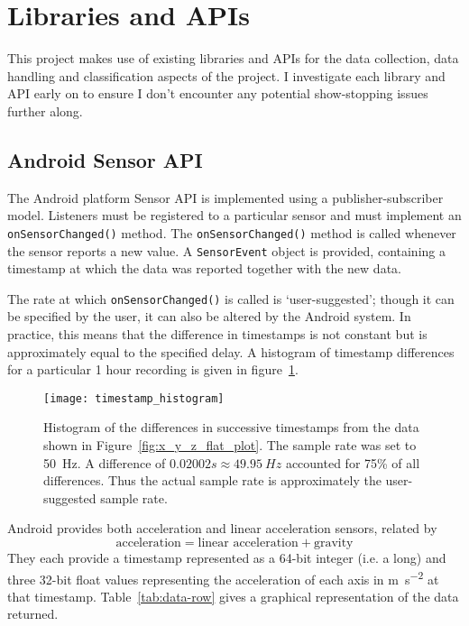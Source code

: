   
  \section{Libraries and APIs}
      This project makes use of existing libraries and APIs for the data collection, data handling
      and classification aspects of the project. I investigate each library and API early on to ensure I don't encounter any potential show-stopping issues further along. 
    
    \subsection{Android Sensor API}
      \label{sec:sensor-api}
      The Android platform Sensor API\cite{androidsensoreventapi} is implemented using a publisher-subscriber model. Listeners must be registered
      to a particular sensor and must implement an \texttt{onSensorChanged()}
      method. The \texttt{onSensorChanged()} method is called whenever the sensor reports a new 
      value. A \texttt{SensorEvent} object is provided, containing a timestamp at which the data was
      reported together with the new data.
      
      The rate at which \texttt{onSensorChanged()} is called is `user-suggested'; though it can be 
      specified by the user, it can also be altered by the Android system. In practice, this means
      that the difference in timestamps is not constant but is approximately equal to the specified 
      delay. A histogram of timestamp differences for a particular 1 hour recording is given in 
      figure~\ref{fig:timestamp-differences}.
      
      \begin{figure}[!b]
        \centering
        \texttt{[image: timestamp\_histogram]}
        \caption[Histogram of the differences in successive timestamps]{Histogram of the differences in successive timestamps from the data shown in Figure~\ref{fig:x_y_z_flat_plot}. 
            The sample rate was set to 50~\si{Hz}. A difference of $0.02002\si{s} \approx 49.95~\si{Hz}$ accounted for 75\% of all differences.
            Thus the actual sample rate is approximately the user-suggested sample rate.}
        \label{fig:timestamp-differences}
      \end{figure}
      
      Android provides both acceleration and linear acceleration sensors, related by 
      $$\textrm{acceleration} = \textrm{linear acceleration} + \textrm{gravity}$$
      They each provide a timestamp represented as a 64-bit integer (i.e. a long) and three 32-bit float values representing the 
      acceleration of each axis in \si{\metre\per\square\second} at that timestamp.   
      Table~\ref{tab:data-row} gives a graphical representation of the data returned.
      
